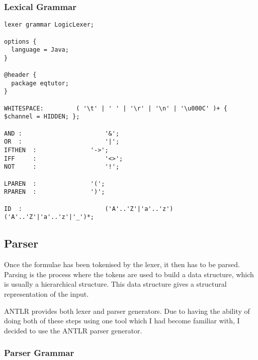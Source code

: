 \documentclass{report}
\begin{document}
\subsubsection{Lexical Grammar}
\begin{verbatim}
lexer grammar LogicLexer;

options {
  language = Java;
}

@header {
  package eqtutor;
}

WHITESPACE:			( '\t' | ' ' | '\r' | '\n' | '\u000C' )+ { $channel = HIDDEN; };

AND	:						'&';
OR	:						'|';
IFTHEN	:				'->';
IFF 	:					'<>';
NOT 	:					'!';

LPAREN  :				'(';
RPAREN  :				')';

ID	:						('A'..'Z'|'a'..'z') ('A'..'Z'|'a'..'z'|'_')*;
\end{verbatim}

\subsection{Parser}

Once the formulae has been tokenised by the lexer, it then has to be parsed. Parsing
is the process where the tokens are used to build a data structure, which is usually
a hierarchical structure. This data structure gives a structural representation
of the input.

ANTLR provides both lexer and parser generators. Due to having the ability of doing both
of these steps using one tool which I had become familiar with, I decided to use the
ANTLR parser generator.


\subsubsection{Parser Grammar}
\end{document}
